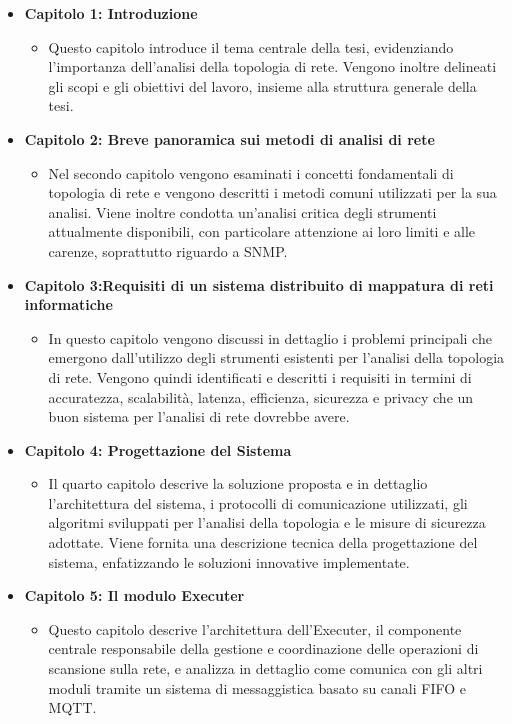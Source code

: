 \documentclass[target=bach,aauheader=,style=]{thud}
\begin{document}
\begin{itemize}
  \item \textbf{Capitolo 1: Introduzione}
  \begin{itemize}
    \item[] Questo capitolo introduce il tema centrale della tesi, evidenziando l'importanza dell'analisi della topologia di rete. Vengono inoltre delineati gli scopi e gli obiettivi del lavoro, insieme alla struttura generale della tesi.
  \end{itemize}


\item \textbf{Capitolo 2: Breve panoramica sui metodi di analisi di rete}
    \begin{itemize}
      \item[] Nel secondo capitolo vengono esaminati i concetti fondamentali di topologia di rete e vengono descritti i metodi comuni utilizzati per la sua analisi. Viene inoltre condotta un'analisi critica degli strumenti attualmente disponibili, con particolare attenzione ai loro limiti e alle carenze, soprattutto riguardo a SNMP.
    \end{itemize}


  \item \textbf{Capitolo 3:Requisiti di un sistema distribuito di mappatura di reti informatiche}
    \begin{itemize}
      \item[] In questo capitolo vengono discussi in dettaglio i problemi principali che emergono dall'utilizzo degli strumenti esistenti per l'analisi della topologia di rete. Vengono quindi identificati e descritti i requisiti in termini di accuratezza, scalabilità, latenza, efficienza, sicurezza e privacy che un buon sistema per l'analisi di rete dovrebbe avere.
    \end{itemize}


  \item \textbf{Capitolo 4: Progettazione del Sistema}
    \begin{itemize}
      \item[] Il quarto capitolo descrive la soluzione proposta e in dettaglio l'architettura del sistema, i protocolli di comunicazione utilizzati, gli algoritmi sviluppati per l'analisi della topologia e le misure di sicurezza adottate. Viene fornita una descrizione tecnica della progettazione del sistema, enfatizzando le soluzioni innovative implementate.
    \end{itemize}


  \item \textbf{Capitolo 5: Il modulo Executer}
    \begin{itemize}
      \item[] Questo capitolo descrive l'architettura dell'Executer, il componente centrale responsabile della gestione e coordinazione delle operazioni di scansione sulla rete, e analizza in dettaglio come comunica con gli altri moduli tramite un sistema di messaggistica basato su canali FIFO e MQTT.
    \end{itemize}



\end{itemize}
\end{document}
